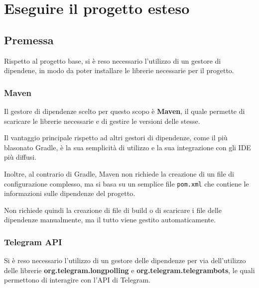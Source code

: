 \section{Eseguire il progetto esteso}

\subsection{Premessa}

Rispetto al progetto base, si è reso necessario l'utilizzo di un gestore di dipendene, in modo da poter installare le librerie necessarie per il progetto. 

\subsubsection*{Maven}

Il gestore di dipendenze scelto per questo scopo è \textbf{Maven}, il quale permette di scaricare le librerie necessarie e di gestire le versioni delle stesse.

Il vantaggio principale rispetto ad altri gestori di dipendenze, come il più blasonato Gradle, è la sua semplicità di utilizzo e la sua integrazione con gli IDE più diffusi. 

Inoltre, al contrario di Gradle, Maven non richiede la creazione di un file di configurazione complesso, ma si basa su un semplice file \texttt{pom.xml} che contiene le informazioni sulle dipendenze del progetto. 

Non richiede quindi la creazione di file di build o di scaricare i file delle dipendenze manualmente, ma il tutto viene gestito automaticamente. 

\subsubsection*{Telegram API}

Si è reso necessario l'utilizzo di un gestore delle dipendenze per via dell'utilizzo delle librerie \textbf{org.telegram.longpolling} e \textbf{org.telegram.telegrambots}, le quali permettono di interagire con l'API di Telegram. 

